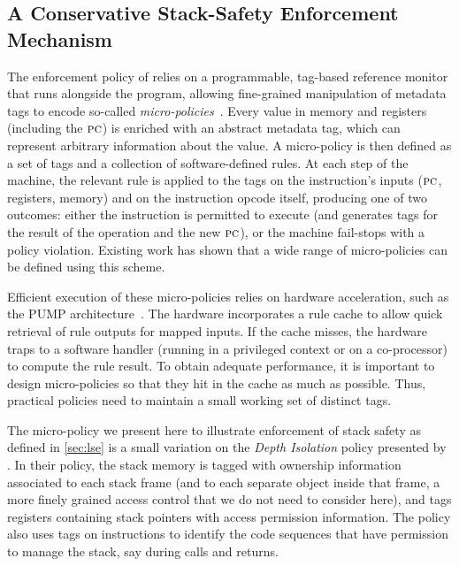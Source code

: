 \documentclass[acmsmall,review,anonymous]{acmart}\settopmatter{printfolios=true,printccs=false,printacmref=false}
\begin{document}
{\subsection{A Conservative Stack-Safety Enforcement Mechanism}
%
The enforcement policy of \citeauthor{DBLP:conf/sp/RoesslerD18} relies
on a programmable, tag-based reference monitor that runs alongside the
program,
allowing fine-grained manipulation of metadata tags to encode so-called
\emph{micro-policies}~\citep{pump_oakland2015}.
Every value in
memory and registers (including the $\textsc{pc}$)
is enriched with an abstract metadata tag, which can represent
arbitrary information about the value. A micro-policy is then defined as a
set of tags and a
collection of software-defined rules.
At each step of the machine, the relevant rule is applied to the tags on
the instruction's inputs ($\textsc{pc}$, registers, memory) and on the
instruction opcode itself, producing
one of two outcomes: either the instruction is permitted to execute (and
generates tags for the result of the operation and the new $\textsc{pc}$), or
the machine fail-stops with a policy violation.
Existing work \citep{TestingNI:ICFP,pump_oakland2015, DBLP:conf/sp/RoesslerD18}
has shown that a wide range of
micro-policies can be defined using this scheme.

Efficient execution of these micro-policies relies on hardware acceleration,
such as the PUMP architecture~\citep{pump:asplos2015}.
The hardware incorporates a rule cache
to allow quick retrieval of rule outputs for mapped inputs. If the cache misses,
the hardware traps to a software handler (running in a privileged context or
on a co-processor) to compute the rule result. To obtain adequate performance,
it is important to design micro-policies so that they hit in the cache as
much as possible. Thus, practical policies need to maintain a small working
set of distinct tags.


The micro-policy we present here to illustrate enforcement of stack
safety as defined in \cref{sec:lse} is a small variation
on the {\em Depth Isolation} policy presented by
\citet{DBLP:conf/sp/RoesslerD18}. In their policy,  the stack memory is tagged
with ownership information associated to each stack frame (and to each
separate object inside that frame, a more finely grained access
control that we do not need to consider here), and tags registers containing
stack pointers with access permission information. The policy also
uses tags on instructions to identify the code
sequences that have permission to manage the stack, say during calls and returns.

}
\end{document}

